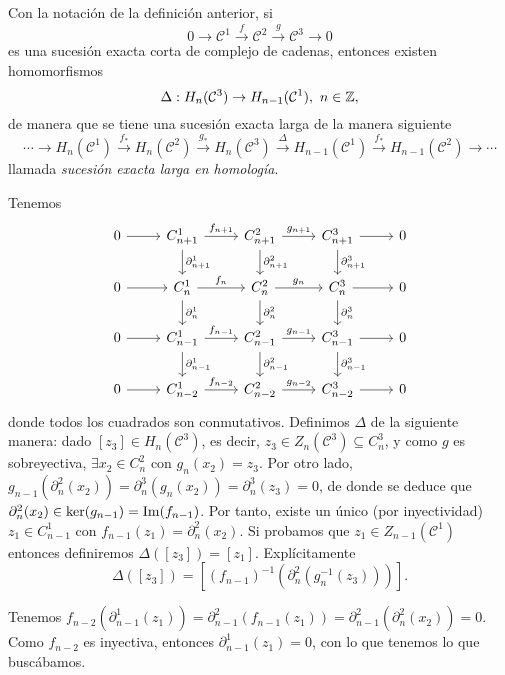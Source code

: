 \documentclass[HS.tex]{subfiles}
\begin{document}
\begin{prop}\label{long}
Con la notación de la definición anterior, si 
\[
0\to \mathcal{C}^1\overset{f}{\to}\mathcal{C}^2\overset{g}{\to}\mathcal{C}^3\to 0
\]
es una sucesión exacta corta de complejo de cadenas, entonces existen homomorfismos
\[
\Delta:H_n(\mathcal{C}^3)\to H_{n-1}(\mathcal{C}^1),\ n\in\mathbb{Z},
\]
de manera que se tiene una sucesión exacta larga de la manera siguiente
\[
\cdots\to H_n(\mathcal{C}^1)\overset{f_*}{\to}H_n(\mathcal{C}^2)\overset{g_*}{\to}H_n(\mathcal{C}^3)\overset{\Delta}{\to}H_{n-1}(\mathcal{C}^1)\overset{f_*}{\to}H_{n-1}(\mathcal{C}^2)\to\cdots
\]
llamada \emph{sucesión exacta larga en homología}.
\end{prop}

\begin{dem}
Tenemos
\[\begin{tikzcd}
0\arrow[r] & C_{n+1}^1\arrow[r, "f_{n+1}"]\arrow[d, "\partial_{n+1}^1"]& C_{n+1}^2\arrow[r, "g_{n+1}"]\arrow[d,"\partial_{n+1}^2"]& C_{n+1}^3\arrow[r]\arrow[d,"\partial_{n+1}^3"] & 0\\
0\arrow[r] & C_{n}^1\arrow[r, "f_{n}"]\arrow[d, "\partial_{n}^1"]& C_n^2\arrow[r, "g_{n}"]\arrow[d,"\partial_{n}^2"]& C_{n}^3\arrow[r]\arrow[d,"\partial_{n}^3"] & 0\\
0\arrow[r] & C_{n-1}^1\arrow[r, "f_{n-1}"]\arrow[d, "\partial_{n-1}^1"]& C_{n-1}^2\arrow[r, "g_{n-1}"] \arrow[d,"\partial_{n-1}^2"]& C_{n-1}^3\arrow[r]\arrow[d,"\partial_{n-1}^3"]&  0\\
0\arrow[r] & C_{n-2}^1\arrow[r, "f_{n-2}"]& C_{n-2}^2\arrow[r, "g_{n-2}"]& C_{n-2}^3\arrow[r] & 0
\end{tikzcd}
\]
donde todos los cuadrados son conmutativos. Definimos $\Delta$ de la siguiente manera: dado $[z_3]\in H_n(\mathcal{C}^3)$, es decir, $z_3\in Z_n(\mathcal{C}^3)\subseteq C_n^3$, y como $g$ es sobreyectiva, $\exists x_2\in C_n^2$ con $g_n(x_2)=z_3$. Por otro lado, $g_{n-1}(\partial_n^2(x_2))=\partial_n^3(g_n(x_2))=\partial_n^3(z_3)=0$, de donde se deduce que $\partial_n^2(x_2)\in\ker(g_{n-1})=\operatorname{Im}(f_{n-1})$. Por tanto, existe un único (por inyectividad) $z_1\in C_{n-1}^1$ con $f_{n-1}(z_1)=\partial^2_n(x_2)$. Si probamos que $z_1\in Z_{n-1}(\mathcal{C}^1)$ entonces definiremos $\Delta([z_3])=[z_1]$. Explícitamente
\[
\Delta([z_3])=[(f_{n-1})^{-1}(\partial_n^2(g_n^{-1}(z_3)))].
\]

Tenemos $f_{n-2}(\partial^1_{n-1}(z_1))=\partial^2_{n-1}(f_{n-1}(z_1))=\partial^2_{n-1}(\partial^2_n(x_2))=0$. Como $f_{n-2}$ es inyectiva, entonces $\partial^1_{n-1}(z_1)=0$, con lo que tenemos lo que buscábamos.


\end{dem}
\end{document}

